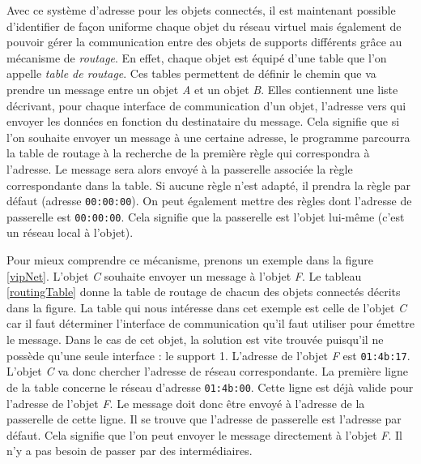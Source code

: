 			Avec ce système d'adresse pour les objets connectés, il est maintenant possible
			d'identifier de façon uniforme chaque objet du réseau virtuel mais également de pouvoir
			gérer la communication entre des objets de supports différents grâce au mécanisme de
			\emph{routage}. En effet, chaque objet est équipé d'une table que l'on appelle
			\emph{table de routage}. Ces tables permettent de définir le chemin que va	prendre un
			message entre un objet \emph{A} et un objet \emph{B}. Elles contiennent une liste 
			décrivant, pour chaque interface de communication d'un objet, l'adresse vers qui envoyer 
			les données en fonction du destinataire du message. Cela signifie que si l'on souhaite
			envoyer un message à une certaine adresse, le programme parcourra la table de routage à la
			recherche de la première règle qui correspondra à l'adresse. Le message sera alors envoyé
			à la passerelle associée la règle correspondante dans la table. Si aucune règle n'est
			adapté, il prendra la règle par défaut (adresse \texttt{00:00:00}). On peut également
			mettre des règles dont l'adresse de passerelle est \texttt{00:00:00}. Cela signifie que
			la passerelle est l'objet lui-même (c'est un réseau local à l'objet).
			
			Pour mieux comprendre ce mécanisme, prenons un exemple dans la figure \ref{vipNet}. L'objet
			\emph{C} souhaite envoyer un message à l'objet \emph{F}. Le tableau \ref{routingTable}
			donne la table de routage de chacun des objets connectés décrits dans la figure. La table
			qui nous intéresse dans cet exemple est celle de l'objet \emph{C} car il faut déterminer
			l'interface de communication qu'il faut utiliser pour émettre le message. Dans le cas de
			cet objet, la solution est vite trouvée puisqu'il ne possède qu'une seule interface :
			le support 1. L'adresse de l'objet \emph{F} est \texttt{01:4b:17}. L'objet \emph{C} va donc
			chercher l'adresse de réseau correspondante. La première ligne de la table concerne le
			réseau d'adresse \texttt{01:4b:00}. Cette ligne est déjà valide pour l'adresse de l'objet
			\emph{F}. Le message doit donc être envoyé à l'adresse de la passerelle de cette ligne.
			Il se trouve que l'adresse de passerelle est l'adresse par défaut. Cela signifie que l'on
			peut envoyer le message directement à l'objet \emph{F}. Il n'y a pas besoin de passer par 
			des intermédiaires.
			
